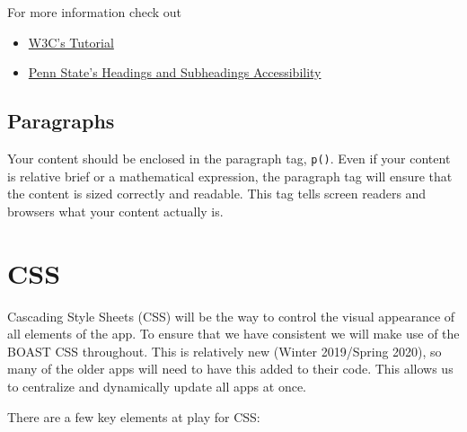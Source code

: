 \documentclass[
]{book}
\providecommand{\tightlist}{%
  \setlength{\itemsep}{0pt}\setlength{\parskip}{0pt}}
\begin{document}
For more information check out

\begin{itemize}
\tightlist
\item
  \href{https://www.w3.org/WAI/tutorials/page-structure/headings/}{W3C's Tutorial}
\item
  \href{https://accessibility.psu.edu/headings/}{Penn State's Headings and Subheadings Accessibility}
\end{itemize}

\hypertarget{paragraphs}{%
\subsection{Paragraphs}\label{paragraphs}}

Your content should be enclosed in the paragraph tag, \texttt{p()}. Even if your content is relative brief or a mathematical expression, the paragraph tag will ensure that the content is sized correctly and readable. This tag tells screen readers and browsers what your content actually is.

\hypertarget{css}{%
\section{CSS}\label{css}}

Cascading Style Sheets (CSS) will be the way to control the visual appearance of all elements of the app. To ensure that we have consistent we will make use of the BOAST CSS throughout. This is relatively new (Winter 2019/Spring 2020), so many of the older apps will need to have this added to their code. This allows us to centralize and dynamically update all apps at once.

There are a few key elements at play for CSS:
\end{document}
